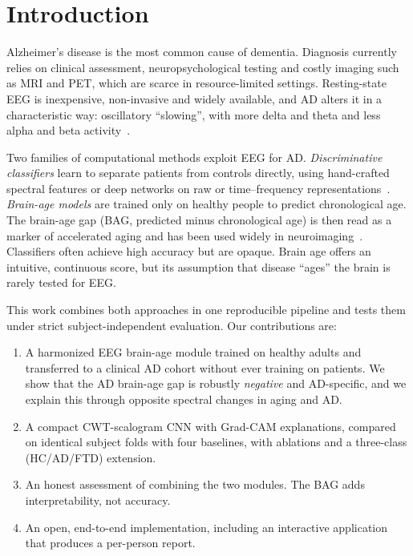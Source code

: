 \documentclass[conference]{IEEEtran}
\begin{document}
\section{Introduction}
Alzheimer's disease is the most common cause of dementia. Diagnosis currently relies on clinical assessment, neuropsychological testing and costly imaging such as MRI and PET, which are scarce in resource-limited settings. Resting-state EEG is inexpensive, non-invasive and widely available, and AD alters it in a characteristic way: oscillatory ``slowing'', with more delta and theta and less alpha and beta activity~\cite{jeong2004,babiloni2020}.

Two families of computational methods exploit EEG for AD. \emph{Discriminative classifiers} learn to separate patients from controls directly, using hand-crafted spectral features or deep networks on raw or time--frequency representations~\cite{craik2019,roy2019}. \emph{Brain-age models} are trained only on healthy people to predict chronological age. The brain-age gap (BAG, predicted minus chronological age) is then read as a marker of accelerated aging and has been used widely in neuroimaging~\cite{cole2017,franke2019}. Classifiers often achieve high accuracy but are opaque. Brain age offers an intuitive, continuous score, but its assumption that disease ``ages'' the brain is rarely tested for EEG.

This work combines both approaches in one reproducible pipeline and tests them under strict subject-independent evaluation. Our contributions are:
\begin{enumerate}
\item A harmonized EEG brain-age module trained on healthy adults and transferred to a clinical AD cohort without ever training on patients. We show that the AD brain-age gap is robustly \emph{negative} and AD-specific, and we explain this through opposite spectral changes in aging and AD.
\item A compact CWT-scalogram CNN with Grad-CAM explanations, compared on identical subject folds with four baselines, with ablations and a three-class (HC/AD/FTD) extension.
\item An honest assessment of combining the two modules. The BAG adds interpretability, not accuracy.
\item An open, end-to-end implementation, including an interactive application that produces a per-person report.
\end{enumerate}
\end{document}

